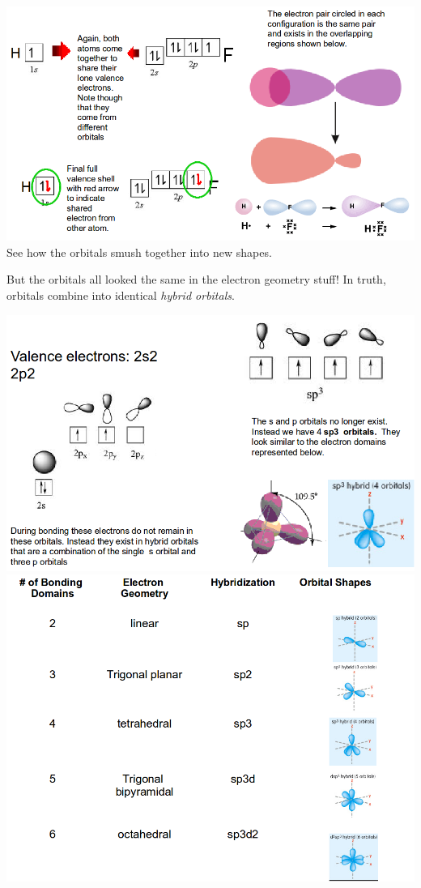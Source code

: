 \documentclass[a4paper, 8pt]{memoir}
\begin{document}
\includegraphics[scale=0.4]{hf} \\
See how the orbitals smush together into new shapes.

But the orbitals all looked the same in the electron geometry stuff! In truth, orbitals combine into identical \emph{hybrid orbitals}.

\includegraphics[scale=0.4]{mh4} \\

\includegraphics[scale=0.4]{hybridizationTable} \\
\end{document}
